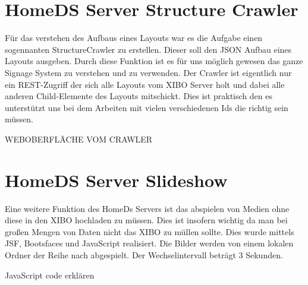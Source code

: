 \section{HomeDS Server Structure Crawler}\label{sec:javaeestructurecrawler}
Für das verstehen des Aufbaus eines Layouts war es die Aufgabe einen sogennanten StructureCrawler zu erstellen. Dieser soll den JSON Aufbau eines Layouts ausgeben. Durch diese Funktion ist es für uns möglich gewesen das ganze Signage System zu verstehen und zu verwenden. Der Crawler ist eigentlich nur ein REST-Zugriff der sich alle Layouts vom XIBO Server holt und dabei alle anderen Child-Elemente des Layouts mitschickt. Dies ist praktisch den es unterstützt uns bei dem Arbeiten mit vielen verschiedenen Ids die richtig sein müssen.

WEBOBERFLÄCHE VOM CRAWLER

\section{HomeDS Server Slideshow}\label{sec:homedsslideshow}
Eine weitere Funktion des HomeDs Servers ist das abspielen von Medien ohne diese in den XIBO hochladen zu müssen. Dies ist insofern wichtig da man bei großen Mengen von Daten nicht das XIBO zu müllen sollte. Dies wurde mittels JSF, Bootsfaces und JavaScript realisiert. Die Bilder werden von einem lokalen Ordner der Reihe nach abgespielt. Der Wechselintervall beträgt 3 Sekunden.

JavaScript	code erklären
